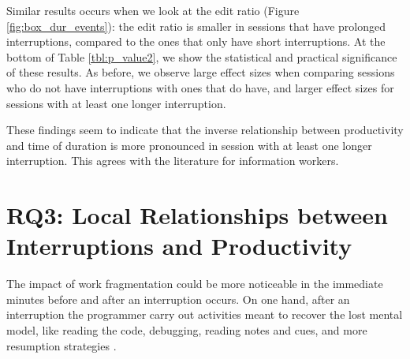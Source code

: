 \documentclass[times]{smrauth}
\begin{document}



Similar results occurs when we look at the edit ratio (Figure \ref{fig:box_dur_events}): the edit ratio is smaller in sessions that have prolonged interruptions, compared to the ones that only have short interruptions. At the bottom of Table \ref{tbl:p_value2}, we show the statistical and practical significance of these results. As before, we observe large effect sizes when comparing sessions who do not have interruptions with ones that do have, and larger effect sizes for sessions with at least one longer interruption.

These findings seem to indicate that the inverse relationship between productivity and time of duration is more pronounced in session with at least one longer interruption. This agrees with the literature for information workers.

\section{RQ3: Local Relationships between Interruptions and Productivity}

The impact of work fragmentation could be more noticeable in the immediate minutes before and after an interruption occurs. On one hand, after an interruption the programmer carry out activities meant to recover the lost mental model, like reading the code, debugging, reading notes and cues, and more resumption strategies \cite{PR11}.
\end{document}
